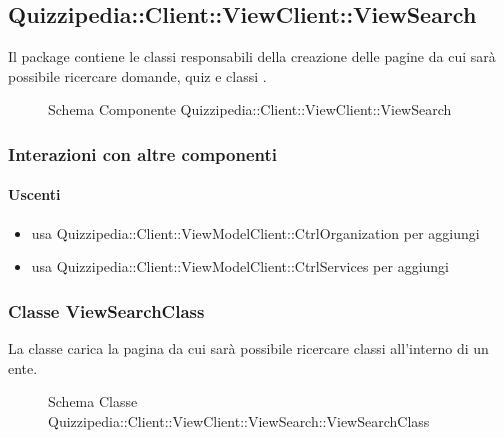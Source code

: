 \subsection{Quizzipedia::Client::ViewClient::ViewSearch}
Il package contiene le classi responsabili della creazione delle pagine da cui sarà possibile ricercare domande, quiz e classi .
\begin{figure}[H]
\centering
\noindent{}
\caption[Schema Componente Quizzipedia::Client::ViewClient::ViewSearch]{Schema Componente Quizzipedia::Client::ViewClient::ViewSearch}
\end{figure}
\subsubsection{Interazioni con altre componenti}
\paragraph{Uscenti}
\begin{itemize}
\item usa Quizzipedia::Client::ViewModelClient::CtrlOrganization per aggiungi
\item usa Quizzipedia::Client::ViewModelClient::CtrlServices per aggiungi
\end{itemize}
\subsubsection{Classe ViewSearchClass}
La classe carica la pagina da cui sarà possibile ricercare classi all'interno di un ente.
\begin{figure}[H]
\centering
\noindent{}
\caption[Schema Classe ViewSearchClass]{Schema Classe Quizzipedia::Client::ViewClient::ViewSearch::ViewSearchClass}
\end{figure}
